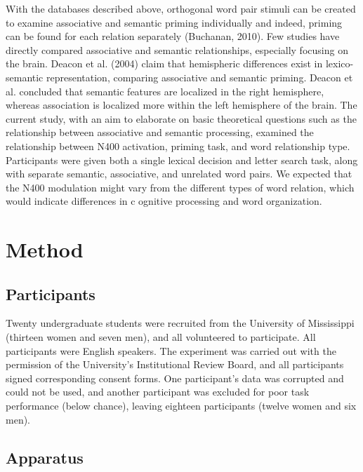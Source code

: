\documentclass[english,man]{apa6}
\theoremstyle{definition}
\theoremstyle{definition}
\theoremstyle{definition}
\theoremstyle{remark}
\begin{document}
With the databases described above, orthogonal word pair stimuli can be
created to examine associative and semantic priming individually and
indeed, priming can be found for each relation separately (Buchanan,
2010). Few studies have directly compared associative and semantic
relationships, especially focusing on the brain. Deacon et al. (2004)
claim that hemispheric differences exist in lexico-semantic
representation, comparing associative and semantic priming. Deacon et
al. concluded that semantic features are localized in the right
hemisphere, whereas association is localized more within the left
hemisphere of the brain. The current study, with an aim to elaborate on
basic theoretical questions such as the relationship between associative
and semantic processing, examined the relationship between N400
activation, priming task, and word relationship type. Participants were
given both a single lexical decision and letter search task, along with
separate semantic, associative, and unrelated word pairs. We expected
that the N400 modulation might vary from the different types of word
relation, which would indicate differences in c ognitive processing and
word organization.

\section{Method}\label{method}

\subsection{Participants}\label{participants}

Twenty undergraduate students were recruited from the University of
Mississippi (thirteen women and seven men), and all volunteered to
participate. All participants were English speakers. The experiment was
carried out with the permission of the University's Institutional Review
Board, and all participants signed corresponding consent forms. One
participant's data was corrupted and could not be used, and another
participant was excluded for poor task performance (below chance),
leaving eighteen participants (twelve women and six men).

\subsection{Apparatus}\label{apparatus}
\end{document}
